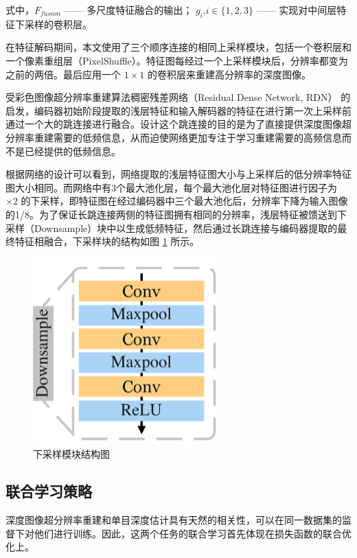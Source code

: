 \noindent 式中，$F_{fusion}$ —— 多尺度特征融合的输出；\newline
\indent\quad $g_i$,$i\in\{1,2,3\}$ —— 实现对中间层特征下采样的卷积层。

在特征解码期间，本文使用了三个顺序连接的相同上采样模块，包括一个卷积层和一个像素重组层（PixelShuffle）。特征图每经过一个上采样模块后，分辨率都变为之前的两倍。最后应用一个 $1 \times 1$ 的卷积层来重建高分辨率的深度图像。

受彩色图像超分辨率重建算法稠密残差网络（Residual Dense Network, RDN）\cite{DBLP:conf/cvpr/ZhangTKZ018} 的启发，编码器初始阶段提取的浅层特征和输入解码器的特征在进行第一次上采样前通过一个大的跳连接进行融合。设计这个跳连接的目的是为了直接提供深度图像超分辨率重建需要的低频信息，从而迫使网络更加专注于学习重建需要的高频信息而不是已经提供的低频信息。

根据网络的设计可以看到，网络提取的浅层特征图大小与上采样后的低分辨率特征图大小相同。而网络中有3个最大池化层，每个最大池化层对特征图进行因子为 $\times 2$ 的下采样，即特征图在经过编码器中三个最大池化后，分辨率下降为输入图像的1/8。为了保证长跳连接两侧的特征图拥有相同的分辨率，浅层特征被馈送到下采样（Downsample）块中以生成低频特征，然后通过长跳连接与编码器提取的最终特征相融合，下采样块的结构如图 \ref{fig:fig3-4} 所示。

\begin{figure}[!htbp]
	\centering
	\includegraphics{figures/20.png}
	\caption{下采样模块结构图}
	\label{fig:fig3-4}
	\vspace{-0.8cm}  %
\end{figure}

\subsection{联合学习策略}
深度图像超分辨率重建和单目深度估计具有天然的相关性，可以在同一数据集的监督下对他们进行训练。因此，这两个任务的联合学习首先体现在损失函数的联合优化上。

